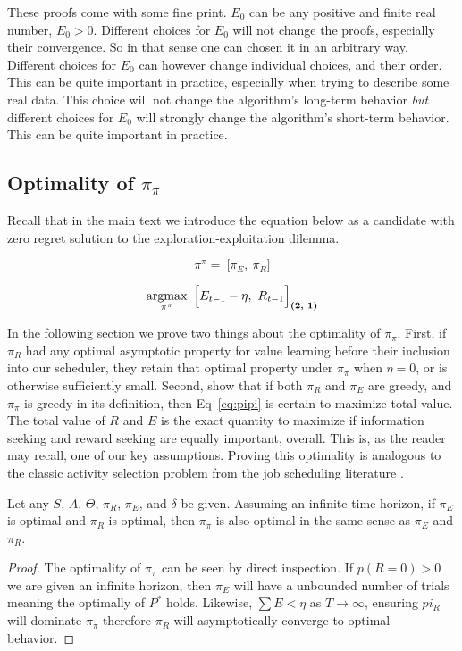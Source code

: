 These proofs come with some fine print. $E_0$ can be any positive and finite real number, $E_0 > 0$. Different choices for $E_0$ will not change the proofs, especially their convergence. So in that sense one can chosen it in an arbitrary way. Different choices for $E_0$ can however change individual choices, and their order. This can be quite important in practice, especially when trying to describe some real data.  This choice will not change the algorithm's long-term behavior \textit{but} different choices for $E_0$ will strongly change the algorithm's short-term behavior. This can be quite important in practice. 

\subsection*{Optimality of $\pi_{\pi}$} \label{sec:opt_pipi} 
Recall that in the main text we introduce the equation below as a candidate with zero regret solution to the exploration-exploitation dilemma.

\begin{equation}
\label{eq:pipi} 
\pi^{\pi} = \ \Big [ \pi_E,\ \pi_R \Big ]
\end{equation}

\begin{equation}
\label{eq:meta_greedy2} 
	\operatorname*{argmax}_{\pi^{\pi}} \ \Big [ E_{t-1} - \eta,\ R_{t-1} \Big ]_{\textbf{(2, 1)}}
\end{equation}

In the following section we prove two things about the optimality of $\pi_\pi$. First, if $\pi_R$ had any optimal asymptotic property for value learning before their inclusion into our scheduler, they retain that optimal property under $\pi_\pi$ when $\eta = 0$, or is otherwise sufficiently small. Second, show that if both $\pi_R$ and $\pi_E$ are greedy, and $\pi_\pi$ is greedy in its definition, then Eq~\ref{eq:pipi} is certain to maximize total value. The total value of $R$ and $E$ is the exact quantity to maximize if information seeking and reward seeking are equally important, overall. This is, as the reader may recall, one of our key assumptions. Proving this optimality is analogous to the classic activity selection problem from the job scheduling literature \citep{BellmanBook,Roughgarden2019}.

\begin{theorem}[$\pi_{\pi}$ is unbiased] \label{theorem:meta} 
	 Let any $S$, $A$, $\Theta$, $\pi_R$, $\pi_E$, and $\delta$ be given. Assuming an infinite time horizon, if $\pi_E$ is optimal and $\pi_R$ is optimal, then $\pi_{\pi}$ is also optimal in the same sense as $\pi_E$ and $\pi_R$. 
\end{theorem}
\begin{proof}
	The optimality of $\pi_{\pi}$ can be seen by direct inspection. If $p(R = 0) > 0$ we are given an infinite horizon, then $\pi_E$ will have a unbounded number of trials meaning the optimally of $P^*$ holds. Likewise, $\sum E < \eta$ as $T \rightarrow \infty$, ensuring $pi_R$ will dominate $\pi_{\pi}$ therefore $\pi_R$ will asymptotically converge to optimal behavior. 
\end{proof}

